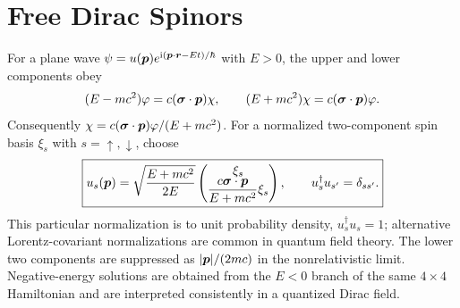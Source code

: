 \section{Free Dirac Spinors}
For a plane wave $\psi=u(\bm{p})e^{\mathrm{i}(\bm{p}\cdot\bm{r}-Et)/\hbar}$ with $E>0$, the upper and lower components obey
\begin{equation}
(E-mc^2)\varphi=c(\bm{\sigma}\cdot\bm{p})\chi,\qquad
(E+mc^2)\chi=c(\bm{\sigma}\cdot\bm{p})\varphi.
\end{equation}
Consequently $\chi=c(\bm{\sigma}\cdot\bm{p})\varphi/(E+mc^2)$. For a normalized two-component spin basis $\xi_s$ with $s=\uparrow,\downarrow$, choose
\begin{equation}
\boxed{u_s(\bm{p})=\sqrt{\frac{E+mc^2}{2E}}
 \begin{pmatrix}\xi_s\\\displaystyle\frac{c\bm{\sigma}\cdot\bm{p}}{E+mc^2}\xi_s\end{pmatrix},\qquad
 u_s^\dagger u_{s'}=\delta_{ss'}.}
\end{equation}
This particular normalization is to unit probability density, $u_s^\dagger u_s=1$; alternative Lorentz-covariant normalizations are common in quantum field theory. The lower two components are suppressed as $|\bm{p}|/(2mc)$ in the nonrelativistic limit. Negative-energy solutions are obtained from the $E<0$ branch of the same $4\times4$ Hamiltonian and are interpreted consistently in a quantized Dirac field.